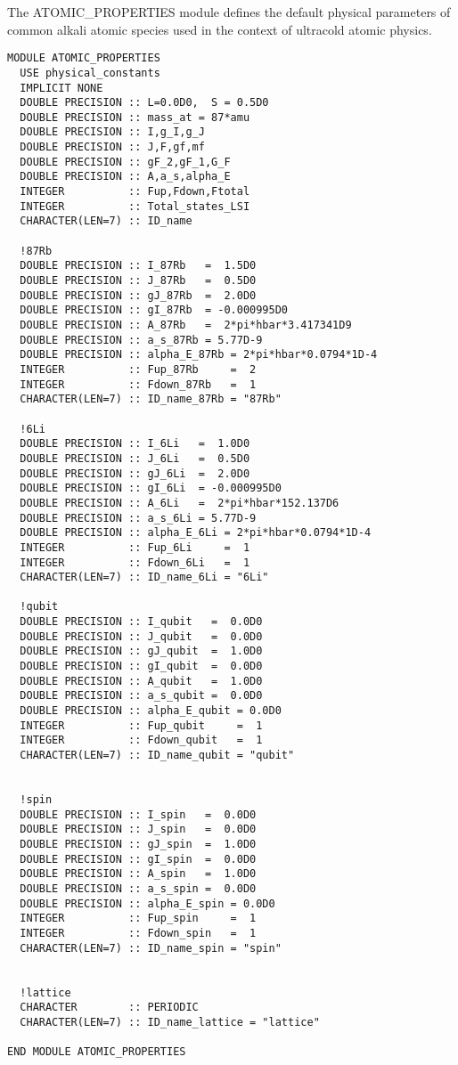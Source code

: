 \documentclass[10pt,a4paper]{article}
\begin{document}
The   ATOMIC\_PROPERTIES  module defines the default physical parameters of common alkali atomic species used in the context of ultracold atomic physics. 

\begin{verbatim}
MODULE ATOMIC_PROPERTIES
  USE physical_constants
  IMPLICIT NONE
  DOUBLE PRECISION :: L=0.0D0,  S = 0.5D0
  DOUBLE PRECISION :: mass_at = 87*amu
  DOUBLE PRECISION :: I,g_I,g_J
  DOUBLE PRECISION :: J,F,gf,mf
  DOUBLE PRECISION :: gF_2,gF_1,G_F
  DOUBLE PRECISION :: A,a_s,alpha_E
  INTEGER          :: Fup,Fdown,Ftotal
  INTEGER          :: Total_states_LSI
  CHARACTER(LEN=7) :: ID_name
  
  !87Rb
  DOUBLE PRECISION :: I_87Rb   =  1.5D0  
  DOUBLE PRECISION :: J_87Rb   =  0.5D0  
  DOUBLE PRECISION :: gJ_87Rb  =  2.0D0
  DOUBLE PRECISION :: gI_87Rb  = -0.000995D0
  DOUBLE PRECISION :: A_87Rb   =  2*pi*hbar*3.417341D9
  DOUBLE PRECISION :: a_s_87Rb = 5.77D-9
  DOUBLE PRECISION :: alpha_E_87Rb = 2*pi*hbar*0.0794*1D-4
  INTEGER          :: Fup_87Rb     =  2
  INTEGER          :: Fdown_87Rb   =  1
  CHARACTER(LEN=7) :: ID_name_87Rb = "87Rb"

  !6Li
  DOUBLE PRECISION :: I_6Li   =  1.0D0  
  DOUBLE PRECISION :: J_6Li   =  0.5D0  
  DOUBLE PRECISION :: gJ_6Li  =  2.0D0
  DOUBLE PRECISION :: gI_6Li  = -0.000995D0
  DOUBLE PRECISION :: A_6Li   =  2*pi*hbar*152.137D6
  DOUBLE PRECISION :: a_s_6Li = 5.77D-9
  DOUBLE PRECISION :: alpha_E_6Li = 2*pi*hbar*0.0794*1D-4
  INTEGER          :: Fup_6Li     =  1
  INTEGER          :: Fdown_6Li   =  1
  CHARACTER(LEN=7) :: ID_name_6Li = "6Li"

  !qubit
  DOUBLE PRECISION :: I_qubit   =  0.0D0
  DOUBLE PRECISION :: J_qubit   =  0.0D0 
  DOUBLE PRECISION :: gJ_qubit  =  1.0D0
  DOUBLE PRECISION :: gI_qubit  =  0.0D0
  DOUBLE PRECISION :: A_qubit   =  1.0D0
  DOUBLE PRECISION :: a_s_qubit =  0.0D0
  DOUBLE PRECISION :: alpha_E_qubit = 0.0D0
  INTEGER          :: Fup_qubit     =  1
  INTEGER          :: Fdown_qubit   =  1
  CHARACTER(LEN=7) :: ID_name_qubit = "qubit"


  !spin
  DOUBLE PRECISION :: I_spin   =  0.0D0
  DOUBLE PRECISION :: J_spin   =  0.0D0
  DOUBLE PRECISION :: gJ_spin  =  1.0D0
  DOUBLE PRECISION :: gI_spin  =  0.0D0
  DOUBLE PRECISION :: A_spin   =  1.0D0
  DOUBLE PRECISION :: a_s_spin =  0.0D0
  DOUBLE PRECISION :: alpha_E_spin = 0.0D0
  INTEGER          :: Fup_spin     =  1
  INTEGER          :: Fdown_spin   =  1
  CHARACTER(LEN=7) :: ID_name_spin = "spin"


  !lattice
  CHARACTER        :: PERIODIC      
  CHARACTER(LEN=7) :: ID_name_lattice = "lattice"
  
END MODULE ATOMIC_PROPERTIES
\end{verbatim}
\newpage
\end{document}
